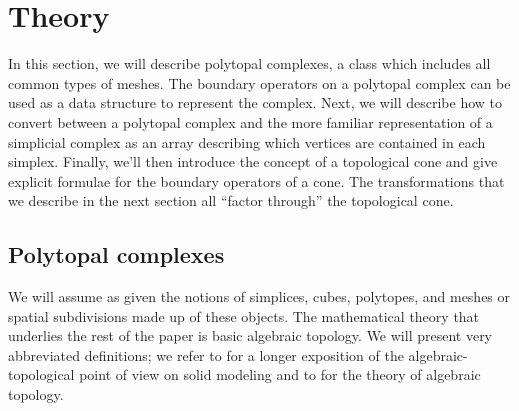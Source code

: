 \documentclass[twocolumn,leqno,twocolumn]{article}
\begin{document}
\section{Theory}

In this section, we will describe polytopal complexes, a class which includes all common types of meshes.
The boundary operators on a polytopal complex can be used as a data structure to represent the complex.
Next, we will describe how to convert between a polytopal complex and the more familiar representation of a simplicial complex as an array describing which vertices are contained in each simplex.
Finally, we'll then introduce the concept of a topological cone and give explicit formulae for the boundary operators of a cone.
The transformations that we describe in the next section all ``factor through'' the topological cone.

\subsection{Polytopal complexes}

We will assume as given the notions of simplices, cubes, polytopes, and meshes or spatial subdivisions made up of these objects.
The mathematical theory that underlies the rest of the paper is basic algebraic topology.
We will present very abbreviated definitions; we refer to \cite{dicarlo2007solid} for a longer exposition of the algebraic-topological point of view on solid modeling and to \cite{hatcher2002algebraic} for the theory of algebraic topology.
\end{document}
